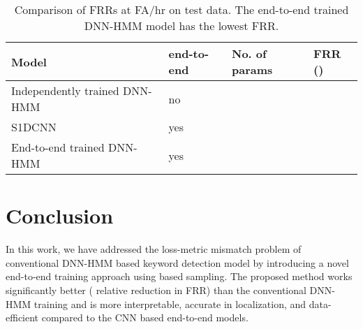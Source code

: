 \documentclass{article}
\begin{document}
\begin{table}[!ht]
    \centering
    \begin{tabular}{@{}C{4.5cm}|C{1cm}|C{1.0cm}|C{0.8cm}@{}}
\toprule[0.015in]
         Model & end-to-end & No. of params   &  FRR ()\\
         \midrule
         Independently trained DNN-HMM & no &    &  \\ \midrule
         S1DCNN~\cite{Higuchi2020} & yes &   &  \\ \midrule
         End-to-end trained DNN-HMM & yes &   & \\
         \bottomrule
    \end{tabular}
    \vspace{-0.1in}
    \caption{Comparison of FRRs at  FA/hr on test data.
     The end-to-end trained DNN-HMM model has the lowest FRR.}
    \label{tab:ModelComparison}
    \vspace{-0.1in}
\end{table}

 
\section{Conclusion}
In this work, we have addressed the loss-metric mismatch problem of conventional DNN-HMM based keyword detection model by introducing a novel end-to-end training approach using  based sampling.
The proposed method works significantly better ( relative reduction in FRR) than the conventional DNN-HMM training and is more interpretable, accurate in localization, and data-efficient compared to the CNN based end-to-end models.
 
\end{document}
